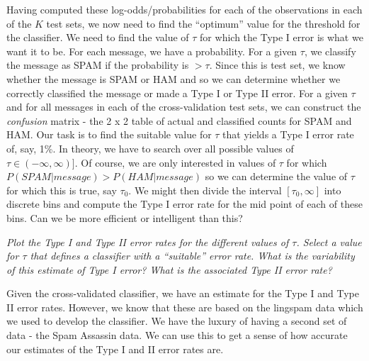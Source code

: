 \documentclass{article}
\begin{document}
Having computed these log-odds/probabilities for each of the
observations in each of the $K$ test sets, we now need to find the
``optimum'' value for the threshold for the classifier.  We need to
find the value of $\tau$ for which the Type I error is what we want it
to be.  For each message, we have a probability.  For a given $\tau$,
we classify the message as SPAM if the probability is $ > \tau$.
Since this is test set, we know whether the message is SPAM or HAM and
so we can determine whether we correctly classified the message or
made a Type I or Type II error.  For a given $\tau$ and for all
messages in each of the cross-validation test sets, we can construct
the \textit{confusion} matrix - the 2 x 2 table of actual and
classified counts for SPAM and HAM.  Our task is to find the suitable
value for $\tau$ that yields a Type I error rate of, say, 1\%.  In
theory, we have to search over all possible values of $\tau \in
(-\infty, \infty)]$.  Of course, we are only interested in values of
$\tau$ for which $P(SPAM| message) > P(HAM | message)$ so we can
determine the value of $\tau$ for which this is true, say $\tau_0$.
We might then divide the interval $[\tau_0, \infty]$ into discrete
bins and compute the Type I error rate for the mid point of each of
these bins.  Can we be more efficient or intelligent than this?

\textit{Plot the Type I and Type II error rates for the different
  values of $\tau$. Select a value for $\tau$ that defines a
  classifier with a ``suitable'' error rate. What is the variability
  of this estimate of Type I error?  What is the associated Type II
  error rate?  }


\par

Given the cross-validated classifier, we have an estimate for the Type
I and Type II error rates.  However, we know that these are based on
the lingspam data which we used to develop the classifier.
We have the luxury of having a second set of data - the Spam Assassin
data. We can use this to get a sense of how accurate our
estimates of the Type I and II error rates are.
\end{document}
